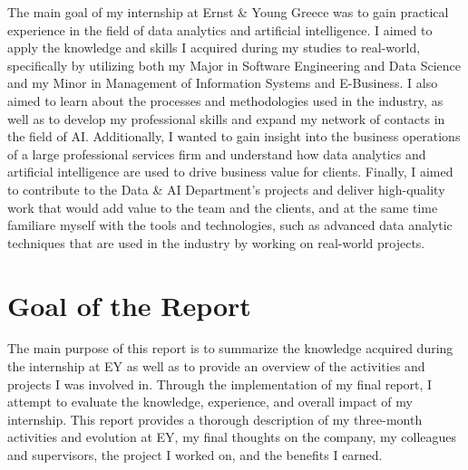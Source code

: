 The main goal of my internship at Ernst \& Young Greece was to gain practical
experience in the field of data analytics and artificial intelligence. I aimed
to apply the knowledge and skills I acquired during my studies to real-world,
specifically by utilizing both my Major in Software Engineering and Data
Science and my Minor in Management of Information Systems and E-Business. I
also aimed to learn about the processes and methodologies used in the industry,
as well as to develop my professional skills and expand my network of contacts
in the field of AI. Additionally, I wanted to gain insight into the business
operations of a large professional services firm and understand how data
analytics and artificial intelligence are used to drive business value for
clients. Finally, I aimed to contribute to the Data \& AI Department's projects
and deliver high-quality work that would add value to the team and the clients,
and at the same time familiare myself with the tools and technologies, such as
advanced data analytic techniques that are used in the industry by working on
real-world projects.

\section{Goal of the Report}

The main purpose of this report is to summarize the knowledge acquired during
the internship at EY as well as to provide an overview of the activities and
projects I was involved in. Through the implementation of my final report, I
attempt to evaluate the knowledge, experience, and overall impact of my
internship. This report provides a thorough description of my three-month
activities and evolution at EY, my final thoughts on the company, my colleagues
and supervisors, the project I worked on, and the benefits I earned.